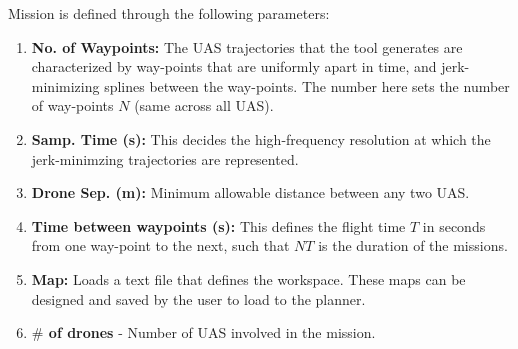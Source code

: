 \documentclass[english]{article}
\begin{document}
Mission is defined through the following parameters:

\begin{enumerate}
    \item \textbf{No. of Waypoints:} The UAS trajectories that the tool generates are characterized by way-points that are uniformly apart in time, and jerk-minimizing splines between the way-points. The number here sets the number of way-points $N$ (same across all UAS).
    
    
    \item \textbf{Samp. Time (s):} This decides the high-frequency resolution at which the jerk-minimzing trajectories are represented.
    \item \textbf{Drone Sep. (m):} Minimum allowable distance between any two UAS.
    \item \textbf{Time between waypoints (s):} This defines the flight time $T$ in seconds from one way-point to the next, such that $NT$ is the duration of the missions.
    
    \item \textbf{Map:} Loads a text file that defines the workspace. These maps can be designed and saved by the user to load to the planner. 
    \item \textbf{$\#$ of drones} - Number of UAS involved in the mission.
    

\end{enumerate}
\end{document}
